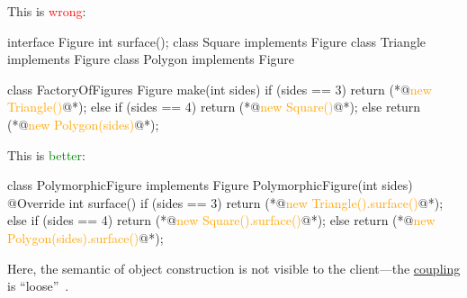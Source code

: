 \documentclass{article}
\begin{document}

\begin{pptWide}{2}
This is \textcolor{red}{wrong}:
\par
{\scriptsize\begin{ffcode}
interface Figure
  int surface();
class Square implements Figure
class Triangle implements Figure
class Polygon implements Figure

class FactoryOfFigures
  Figure make(int sides) {
    if (sides == 3) {
      return (*@\textcolor{orange}{new Triangle()}@*);
    } else if (sides == 4) {
      return (*@\textcolor{orange}{new Square()}@*);
    } else {
      return (*@\textcolor{orange}{new Polygon(sides)}@*);
    }
  }
\end{ffcode}
}
\par\columnbreak\par
This is \textcolor{green}{better}:
\par
{\scriptsize\begin{ffcode}
class PolymorphicFigure implements Figure
  PolymorphicFigure(int sides)
  @Override int surface() {
    if (sides == 3) {
      return (*@\textcolor{orange}{new Triangle().surface()}@*);
    } else if (sides == 4) {
      return (*@\textcolor{orange}{new Square().surface()}@*);
    } else {
      return (*@\textcolor{orange}{new Polygon(sides).surface()}@*);
    }
  }
\end{ffcode}
}
\par
Here, the semantic of object construction is not visible to
the client---the \ul{coupling} is ``loose''~\citep{bugayenko2022blog0605}.
\end{pptWide}
\plush{}
\end{document}
